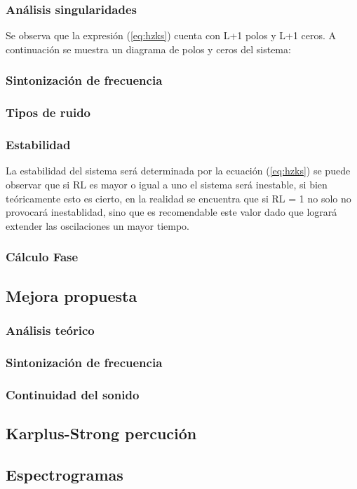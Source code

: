 \subsubsection{Análisis singularidades}
Se observa que la expresión (\ref{eq:hzks}) cuenta con L+1 polos y L+1 ceros. A continuación se muestra un diagrama de polos y ceros del sistema:

\subsubsection{Sintonización de frecuencia}
\subsubsection{Tipos de ruido}
\subsubsection{Estabilidad}
La estabilidad del sistema será determinada por la ecuación (\ref{eq:hzks}) se puede observar que si RL es mayor o igual a uno el sistema será inestable, si bien teóricamente esto es cierto, en la realidad se encuentra que si RL = 1 no solo no provocará inestablidad, sino que es recomendable este valor dado que logrará extender las oscilaciones  un mayor tiempo.
\subsubsection{Cálculo Fase}
\subsection{Mejora propuesta}
\subsubsection{Análisis teórico}
\subsubsection{Sintonización de frecuencia}
\subsubsection{Continuidad del sonido}
\subsection{Karplus-Strong percución}
\subsection{Espectrogramas}
